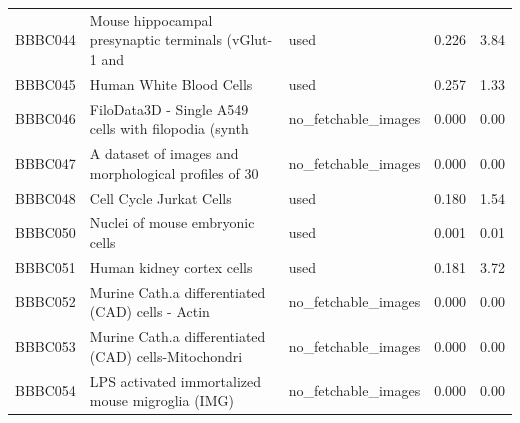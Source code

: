 \begin{longtable}{l p{6.2cm} l c c}
BBBC044 & Mouse hippocampal presynaptic terminals (vGlut-1 and & used & 0.226 & 3.84 \\
BBBC045 & Human White Blood Cells & used & 0.257 & 1.33 \\
BBBC046 & FiloData3D - Single A549 cells with filopodia (synth & no\_fetchable\_images & 0.000 & 0.00 \\
BBBC047 & A dataset of images and morphological profiles of 30 & no\_fetchable\_images & 0.000 & 0.00 \\
BBBC048 & Cell Cycle Jurkat Cells & used & 0.180 & 1.54 \\
BBBC050 & Nuclei of mouse embryonic cells & used & 0.001 & 0.01 \\
BBBC051 & Human kidney cortex cells & used & 0.181 & 3.72 \\
BBBC052 & Murine Cath.a differentiated (CAD) cells - Actin & no\_fetchable\_images & 0.000 & 0.00 \\
BBBC053 & Murine Cath.a differentiated (CAD) cells-Mitochondri & no\_fetchable\_images & 0.000 & 0.00 \\
BBBC054 & LPS activated immortalized mouse migroglia (IMG) & no\_fetchable\_images & 0.000 & 0.00 \\
\hline
\end{longtable}
